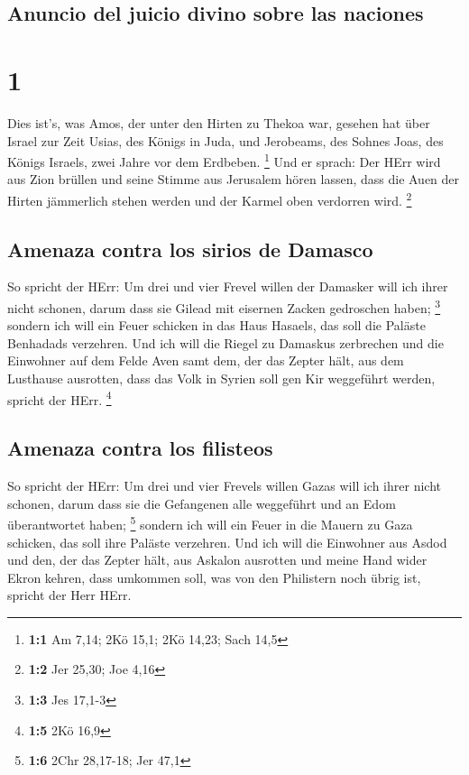 \hypertarget{anuncio-del-juicio-divino-sobre-las-naciones}{%
\subsection{Anuncio del juicio divino sobre las
naciones}\label{anuncio-del-juicio-divino-sobre-las-naciones}}

\hypertarget{section}{%
\section{1}\label{section}}

 Dies ist's, was Amos, der unter den Hirten zu Thekoa war,
gesehen hat über Israel zur Zeit Usias, des Königs in Juda, und
Jerobeams, des Sohnes Joas, des Königs Israels, zwei Jahre vor dem
Erdbeben. \footnote{\textbf{1:1} Am 7,14; 2Kö 15,1; 2Kö 14,23; Sach 14,5}
 Und er sprach: Der HErr wird aus Zion brüllen und seine
Stimme aus Jerusalem hören lassen, dass die Auen der Hirten jämmerlich
stehen werden und der Karmel oben verdorren wird. \footnote{\textbf{1:2}
  Jer 25,30; Joe 4,16}

\hypertarget{amenaza-contra-los-sirios-de-damasco}{%
\subsection{Amenaza contra los sirios de
Damasco}\label{amenaza-contra-los-sirios-de-damasco}}

 So spricht der HErr: Um drei und vier Frevel willen der
Damasker will ich ihrer nicht schonen, darum dass sie Gilead mit
eisernen Zacken gedroschen haben; \footnote{\textbf{1:3} Jes 17,1-3}
 sondern ich will ein Feuer schicken in das Haus Hasaels,
das soll die Paläste Benhadads verzehren.  Und ich will
die Riegel zu Damaskus zerbrechen und die Einwohner auf dem Felde Aven
samt dem, der das Zepter hält, aus dem Lusthause ausrotten, dass das
Volk in Syrien soll gen Kir weggeführt werden, spricht der HErr.
\footnote{\textbf{1:5} 2Kö 16,9}

\hypertarget{amenaza-contra-los-filisteos}{%
\subsection{Amenaza contra los
filisteos}\label{amenaza-contra-los-filisteos}}

 So spricht der HErr: Um drei und vier Frevels willen
Gazas will ich ihrer nicht schonen, darum dass sie die Gefangenen alle
weggeführt und an Edom überantwortet haben; \footnote{\textbf{1:6} 2Chr
  28,17-18; Jer 47,1}  sondern ich will ein Feuer in die
Mauern zu Gaza schicken, das soll ihre Paläste verzehren. 
Und ich will die Einwohner aus Asdod und den, der das Zepter hält, aus
Askalon ausrotten und meine Hand wider Ekron kehren, dass umkommen soll,
was von den Philistern noch übrig ist, spricht der Herr HErr.

